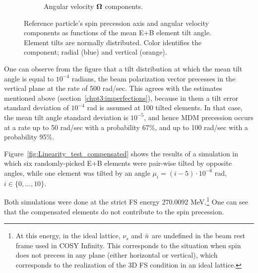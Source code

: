 \begin{figure}[!h]
\begin{subfigure}{\linewidth}
		\caption{Angular velocity $\boldsymbol{\Omega}$ components.}
	\end{subfigure}
	\caption{Reference particle's spin precession axis and angular velocity components as
		 functions of the mean E+B element tilt angle. Element tilts are normally distributed.
		Color identifies the component; radial (blue) and vertical (orange).\label{fig:Linearity_test_shifting_gauss}}
\end{figure}

One can observe from the figure that a tilt distribution at which the mean tilt angle is equal to $10^{-4}$ radians, the
beam polarization vector precesses in the vertical plane at the rate of 500 rad/sec. This agrees with the estimates
mentioned above (section~\ref{chpt3:imperfections}), because in them a tilt error standard deviation of $10^{-4}$ rad 
is assumed at 100 tilted elements. In that case, the mean tilt angle standard deviation is $10^{-5}$, and hence MDM
precession occurs at a rate up to 50 rad/sec with a probability 67\%, and up to 100 rad/sec with a probability 95\%.

Figure~\ref{fig:Linearity_test_compensated} shows the results of a simulation in which six randomly-picked
E+B elements were pair-wise tilted by opposite angles, while one element was tilted by an angle
$\mu_i = (i-5)\cdot 10^{-6}$ rad, $i\in\lbrace0,\dots,10\rbrace$. 

Both simulations were done at the strict FS energy 270.0092 MeV.\footnote{At this energy, in the ideal lattice, 
	$\nu_s$ and $\bar n$	are undefined in the beam rest frame used in COSY Infinity.
	This corresponds to the situation when spin does not precess in any plane (either horizontal or vertical), 
	which corresponds to the realization of the 3D FS condition in an ideal lattice.} One can see that the compensated
elements do not contribute to the spin precession.

